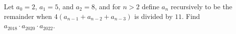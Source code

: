 Let $a_0 = 2$, $a_1 = 5$, and $a_2 = 8$, and for $n>2$ define $a_n$ recursively to be the remainder when $4(a_{n-1} + a_{n-2} + a_{n-3})$ is divided by $11$.  Find $a_{2018}\cdot a_{2020}\cdot a_{2022}$.